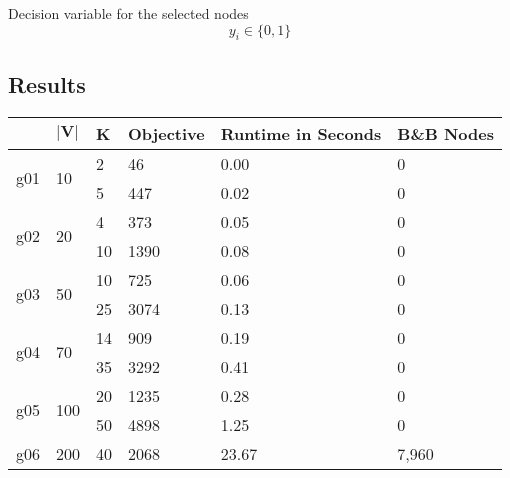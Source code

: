 \documentclass{article}
\begin{document}
\noindent
Decision variable for the selected nodes
\[y_i \in \{0,1\} \tag*{$\forall i \in V$}\]

\subsection{Results}
\begin{table}[h!]
	\centering
	\label{tab:scf}
	\begin{tabular}{l|l|l|l|l|l}
		\textbf{}           & $\mathbf{|V|}$      	& \textbf{K} 	& \textbf{Objective} & \textbf{Runtime in Seconds} & \textbf{B\&B Nodes} \\ \hline
		\multirow{2}{*}{g01}& \multirow{2}{*}{10} 	& 2          	& 46                 & 0.00                        & 0                                        \\
							&                   	& 5       		& 447                & 0.02                        & 0                                        \\ \hline
		\multirow{2}{*}{g02}& \multirow{2}{*}{20} 	& 4          	& 373                & 0.05                        & 0                                        \\
							&                   	& 10        	& 1390               & 0.08                        & 0                                        \\ \hline
		\multirow{2}{*}{g03}& \multirow{2}{*}{50} 	& 10         	& 725                & 0.06                        & 0                                        \\
							&                   	& 25         	& 3074               & 0.13                        & 0                                        \\ \hline
		\multirow{2}{*}{g04}& \multirow{2}{*}{70} 	& 14         	& 909                & 0.19                        & 0                                        \\
							&                   	& 35         	& 3292               & 0.41                        & 0                                        \\ \hline
		\multirow{2}{*}{g05}& \multirow{2}{*}{100} 	& 20         	& 1235               & 0.28                        & 0                                        \\
							&                   	& 50         	& 4898               & 1.25                        & 0                                       \\ \hline
		\multirow{2}{*}{g06}& \multirow{2}{*}{200} 	& 40         	& 2068               & 23.67                       & 7,960                                     \\

\end{tabular}
\end{table}
\end{document}
